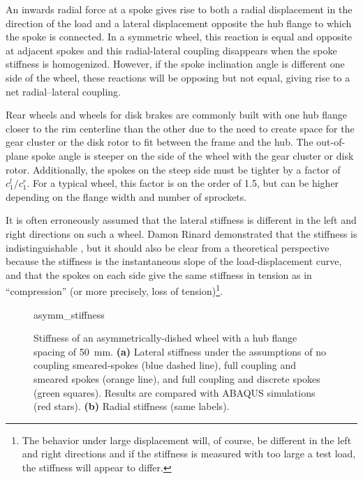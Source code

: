 \documentclass[\rootdir/thesis.tex]{subfiles}
\begin{document}
An inwards radial force at a spoke gives rise to both a radial displacement in the direction of the load and a lateral displacement opposite the hub flange to which the spoke is connected. In a symmetric wheel, this reaction is equal and opposite at adjacent spokes and this radial-lateral coupling disappears when the spoke stiffness is homogenized. However, if the spoke inclination angle is different one side of the wheel, these reactions will be opposing but not equal, giving rise to a net radial--lateral coupling.

Rear wheels and wheels for disk brakes are commonly built with one hub flange closer to the rim centerline than the other due to the need to create space for the gear cluster or the disk rotor to fit between the frame and the hub. The out-of-plane spoke angle is steeper on the side of the wheel with the gear cluster or disk rotor. Additionally, the spokes on the steep side must be tighter by a factor of $c_1^l/c_1^r$. For a typical wheel, this factor is on the order of 1.5, but can be higher depending on the flange width and number of sprockets.

It is often erroneously assumed that the lateral stiffness is different in the left and right directions on such a wheel. Damon Rinard demonstrated that the stiffness is indistinguishable \cite{Rinard}, but it should also be clear from a theoretical perspective because the stiffness is the instantaneous slope of the load-displacement curve, and that the spokes on each side give the same stiffness in tension as in ``compression'' (or more precisely, loss of tension)\footnote{The behavior under large displacement will, of course, be different in the left and right directions and if the stiffness is measured with too large a test load, the stiffness will appear to differ.}.

\begin{figure}[t]
\centering
{asymm_stiffness}
\caption[Stiffness of wheels with left-right asymmetry]{Stiffness of an asymmetrically-dished wheel with a hub flange spacing of \SI{50}{mm}. \textbf{(a)} Lateral stiffness under the assumptions of no coupling smeared-spokes (blue dashed line), full coupling and smeared spokes (orange line), and full coupling and discrete spokes (green squares). Results are compared with ABAQUS simulations (red stars). \textbf{(b)} Radial stiffness (same labels).}
\label{fig:asymm_wheel}
\end{figure}
\end{document}
